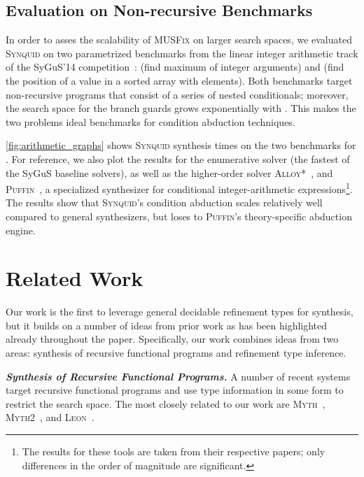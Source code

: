 \documentclass[10pt,preprint]{sigplanconf-pldi16}
\theoremstyle{definition}
\newcommand{\custompar}[1]{\parskip 0pt \textbf{\textit{#1}}}
\newcommand{\tool}{\textsc{Synquid}\xspace}
\begin{document}
\subsection{Evaluation on Non-recursive Benchmarks}

In order to asses the scalability of \textsc{MUSFix} on larger search spaces, 
we evaluated \tool on two parametrized benchmarks from the linear integer arithmetic track of the SyGuS'14 competition~\cite{AlurBJMRSSSTU13}: 
 (find maximum of  integer arguments)
and  (find the position of a value in a sorted array with  elements).
Both benchmarks target non-recursive programs that consist of a series of nested conditionals;
moreover, the search space for the branch guards grows exponentially with .
This makes the two problems ideal benchmarks for condition abduction techniques.

\autoref{fig:arithmetic_graphs} shows \tool synthesis times on the two benchmarks for .
For reference, we also plot the results for the enumerative solver (the fastest of the SyGuS baseline solvers),
as well as the higher-order solver \textsc{Alloy*}~\cite{MilicevicNKJ15},
and \textsc{Puffin}~\cite{AlurCR15}, a specialized synthesizer for conditional integer-arithmetic expressions\footnote{The results for these tools are taken from their respective papers;
only differences in the order of magnitude are significant.}.
The results show that \tool's condition abduction scales relatively well compared to general synthesizers,
but loses to \textsc{Puffin}'s theory-specific abduction engine.


\section{Related Work}\label{sec:related}

Our work is the first to leverage general decidable refinement types for synthesis, but it builds on a number of ideas
from prior work as has been highlighted already throughout the paper. Specifically, our work combines ideas from 
two areas: synthesis of recursive functional programs and refinement type inference.

\custompar{Synthesis of Recursive Functional Programs.}
A number of recent systems target recursive functional programs and use type information in some form to restrict the search space. 
The most closely related to our work are \textsc{Myth}~\cite{OseraZd15}, \textsc{Myth2}~\cite{FrankleOWZ16}, and \textsc{Leon}~\cite{KneussKuKuSu13}.
\end{document}
